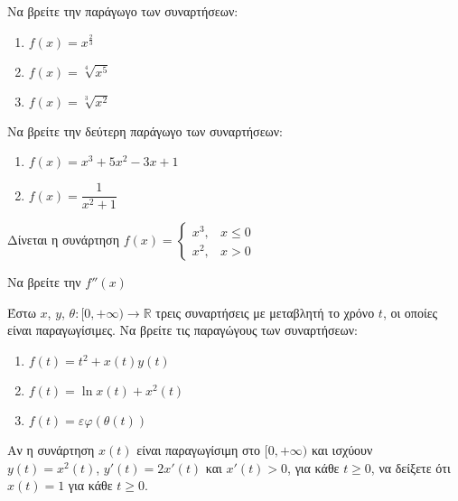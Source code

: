 \documentclass{presentation}
\begin{document}
\begin{askisi}
    Να βρείτε την παράγωγο των συναρτήσεων:
    \begin{enumerate}
        \item<1-> $f(x)=x^{\frac{2}{3}}$
        \item<2-> $f(x)=\sqrt[4]{x^5}$
        \item<3-> $f(x)=\sqrt[3]{x^2}$
    \end{enumerate}

\end{askisi}

\begin{askisi}
    Να βρείτε την δεύτερη παράγωγο των συναρτήσεων:
    \begin{enumerate}
        \item<1-> $f(x)=x^3+5x^2-3x+1$
        \item<2-> $f(x)=\dfrac{1}{x^2+1}$
    \end{enumerate}

\end{askisi}

\begin{askisi}
    Δίνεται η συνάρτηση
    $f(x)=\begin{cases}
            x^3, & x\le 0 \\
            x^2, & x>0
        \end{cases}$

    Να βρείτε την $f''(x)$

\end{askisi}

\begin{askisi}
    Έστω $x$, $y$, $θ:[0,+\infty)\to \mathbb{R}$ τρεις συναρτήσεις με μεταβλητή το χρόνο $t$, οι οποίες είναι παραγωγίσιμες. Να βρείτε τις παραγώγους των συναρτήσεων:
    \begin{enumerate}
        \item<1-> $f(t)=t^2+x(t)y(t)$
        \item<2-> $f(t)=\ln x(t) +x^2(t)$
        \item<3-> $f(t)=εφ(θ(t))$
    \end{enumerate}

\end{askisi}

\begin{askisi}
    Αν η συνάρτηση $x(t)$ είναι παραγωγίσιμη στο $[0,+\infty)$ και ισχύουν $y(t)=x^2(t)$, $y'(t)=2x'(t)$ και $x'(t)>0$, για κάθε $t\ge 0$, να δείξετε ότι $x(t)=1$ για κάθε $t\ge 0$.

\end{askisi}
\end{document}
